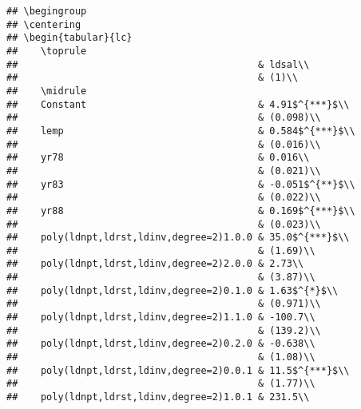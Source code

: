 \documentclass[
]{article}
\begin{document}
\begin{verbatim}
## \begingroup
## \centering
## \begin{tabular}{lc}
##    \toprule
##                                          & ldsal\\  
##                                          & (1)\\  
##    \midrule 
##    Constant                              & 4.91$^{***}$\\   
##                                          & (0.098)\\   
##    lemp                                  & 0.584$^{***}$\\   
##                                          & (0.016)\\   
##    yr78                                  & 0.016\\   
##                                          & (0.021)\\   
##    yr83                                  & -0.051$^{**}$\\   
##                                          & (0.022)\\   
##    yr88                                  & 0.169$^{***}$\\   
##                                          & (0.023)\\   
##    poly(ldnpt,ldrst,ldinv,degree=2)1.0.0 & 35.0$^{***}$\\   
##                                          & (1.69)\\   
##    poly(ldnpt,ldrst,ldinv,degree=2)2.0.0 & 2.73\\   
##                                          & (3.87)\\   
##    poly(ldnpt,ldrst,ldinv,degree=2)0.1.0 & 1.63$^{*}$\\   
##                                          & (0.971)\\   
##    poly(ldnpt,ldrst,ldinv,degree=2)1.1.0 & -100.7\\   
##                                          & (139.2)\\   
##    poly(ldnpt,ldrst,ldinv,degree=2)0.2.0 & -0.638\\   
##                                          & (1.08)\\   
##    poly(ldnpt,ldrst,ldinv,degree=2)0.0.1 & 11.5$^{***}$\\   
##                                          & (1.77)\\   
##    poly(ldnpt,ldrst,ldinv,degree=2)1.0.1 & 231.5\\   

\end{verbatim}
\end{document}
